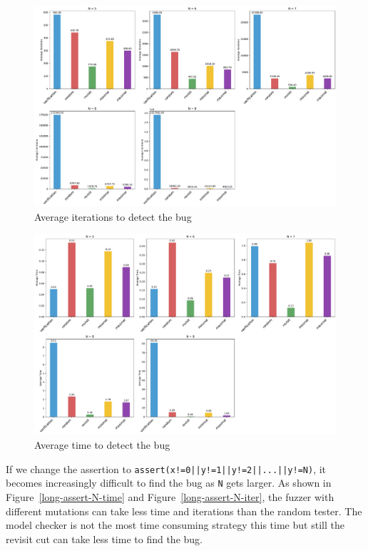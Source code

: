 \begin{figure}[h!tbp]
	\centering
	\includegraphics[scale=0.3]{figure/long-assert/fuzz_assert5_iter.pdf}
	\caption{Average iterations to detect the bug}
	\label{long-assert-N5-iter}
\end{figure}


\begin{figure}[h!tbp]
	\centering
	\includegraphics[scale=0.3]{figure/long-assert/fuzz_assert5_time.pdf}
	\caption{Average time to detect the bug}
	\label{long-assert-N5-time}
\end{figure}

If we change the assertion to \texttt{assert(x!=0||y!=1||y!=2||...||y!=N)}, it becomes increasingly difficult to find the bug as \texttt{N} gets larger. As shown in Figure~\ref{long-assert-N-time} and Figure~\ref{long-assert-N-iter}, the fuzzer with different mutations can take less time and iterations than the random tester. The model checker is not the most time consuming strategy this time but still the revisit cut can take less time to find the bug.


